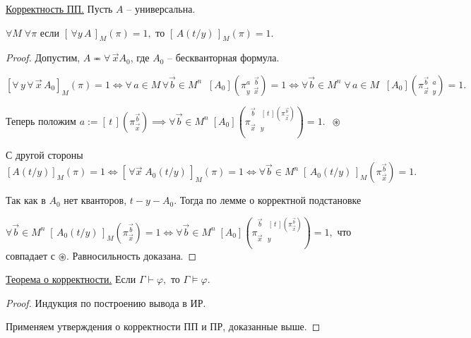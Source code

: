 \documentclass[a4paper, fleqn]{article}
\begin{document}
    \underline{Корректность ПП.} Пусть $A$ -- универсальна.

    $\forall M \; \forall \pi$ если $[ \, \forall y \,  A \, ]_M (\pi) = 1,$  то $[ \, A(t/y) \, ]_M (\pi) = 1.$

    \begin{proof}
    Допустим, $A \eqcirc \forall \, \overrightarrow{x} A_0$, где $A_0$ -- бескванторная формула.

    $[\forall \, y \, \forall \, \overrightarrow{x} \, A_0 ]_M (\pi) = 1 \iff \forall \, a \in M \, \forall  \overrightarrow{b} \in M^n \;  \; [A_0] \left(\pi^{a \; \; \overrightarrow{b}}_{y \; \; \overrightarrow{x}} \right) = 1 \iff \forall  \overrightarrow{b} \in M^n \;   \forall \, a \in M  \;  \; [A_0] \left(\pi^{\overrightarrow{b} \; \; a}_{\overrightarrow{x} \; \; y} \right) = 1.$

    Теперь положим $a := [ \, t \,]  \left(\pi_{\overrightarrow{x}}^{\overrightarrow{b}} \right) \implies \forall \overrightarrow{b} \in M^n \; [A_0] \left( \pi_{\overrightarrow{x} \; \; \, y}^{\overrightarrow{b} \; \; \; [ \, t \,]  \left(\pi_{\overrightarrow{x}}^{\overrightarrow{b}} \right)} \right) = 1. \; \; \circledast$

    С другой стороны $[A(t/y)]_M(\pi) = 1 \iff [ \, \forall \overrightarrow{x} \; A_0 (t/y) \,  ]_M (\pi) = 1 \iff \forall \overrightarrow{b} \in M^n \; [ \, A_0(t/y) \, ]_M \left(\pi_{\overrightarrow{x}}^{\overrightarrow{b}} \right) = 1.$

    Так как в $A_0$  нет кванторов, $t-y-A_0.$ Тогда по лемме о корректной подстановке

    $\forall \overrightarrow{b} \in M^n \; [ \, A_0(t/y) \, ]_M \left(\pi_{\overrightarrow{x}}^{\overrightarrow{b}} \right) = 1 \iff \forall \overrightarrow{b} \in M^n \; [A_0] \left( \pi_{\overrightarrow{x} \; \; \, y}^{\overrightarrow{b} \; \; \; [ \, t \,]  \left(\pi_{\overrightarrow{x}}^{\overrightarrow{b}} \right)} \right) = 1,$ что совпадает с  $\circledast.$ Равносильность доказана.

    \end{proof}

    \underline{Теорема о корректности.} Если $\Gamma \vdash \varphi,$ то $\Gamma \vDash \varphi.$

    \begin{proof} Индукция по построению вывода в ИР.

    Применяем утверждения о корректности ПП и ПР, доказанные выше.
    \end{proof}
\end{document}
